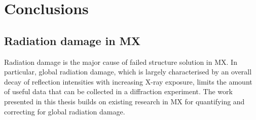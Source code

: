 \chapter{Conclusions}
\label{chap:Conclusions}

\section{Radiation damage in MX}
\label{sec:Radiation damage in MX}
Radiation damage is the major cause of failed structure solution in MX.
In particular, global radiation damage, which is largely characterised by an overall decay of reflection intensities with increasing X-ray exposure, limits the amount of useful data that can be collected in a diffraction experiment.
The work presented in this thesis builds on existing research in MX for quantifying and correcting for global radiation damage.

